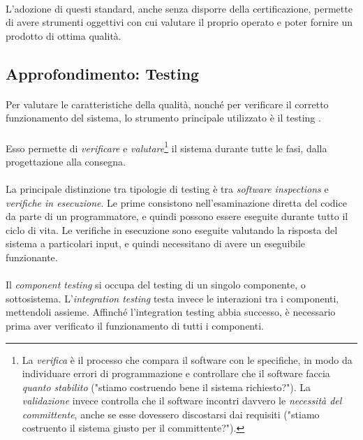 \documentclass[12pt,a4paper,twoside,english,italian]{book}
\begin{document}
\paragraph{} L'adozione di questi standard, anche senza disporre della certificazione, permette di avere strumenti oggettivi con cui valutare il proprio operato e poter fornire un prodotto di ottima qualità.


\subsection{Approfondimento: Testing}

\paragraph{} Per valutare le caratteristiche della qualità, nonché per verificare il corretto funzionamento del sistema, lo strumento principale utilizzato è il testing \cite{testing}. 

\paragraph{} Esso permette di \emph{verificare} e \emph{valutare}\footnote{La \emph{verifica} è il processo che compara il software con le specifiche, in modo da individuare errori di programmazione e controllare che il software faccia \emph{quanto stabilito} ("stiamo costruendo bene il sistema richiesto?"). La \emph{validazione} invece controlla che il software incontri davvero le \emph{necessità del committente}, anche se esse dovessero discostarsi dai requisiti ("stiamo costruento il sistema giusto per il committente?").} il sistema durante tutte le fasi, dalla progettazione alla consegna. 


\newpage

\paragraph{} La principale distinzione tra tipologie di testing è tra \emph{software inspections} e \emph{verifiche in esecuzione}. Le prime consistono nell'esaminazione diretta del codice da parte di un programmatore, e quindi possono essere eseguite durante tutto il ciclo di vita. Le verifiche in esecuzione sono eseguite valutando la risposta del sistema a particolari input, e quindi necessitano di avere un eseguibile funzionante.

\paragraph{} Il \emph{component testing} si occupa del testing di un singolo componente, o sottosistema. L'\emph{integration testing} testa invece le interazioni tra i componenti, mettendoli assieme. Affinché l'integration testing abbia successo, è necessario prima aver verificato il funzionamento di tutti i componenti. 
\end{document}
